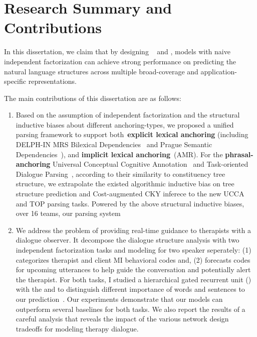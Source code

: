 \section[Research Summary and Contributions]{Research Summary and Contributions}
\label{sec:conclustions:claims}

In this dissertation, we claim that by designing ~ and ,
models with naive independent factorization can achieve strong
performance on predicting the natural language structures across
multiple broad-coverage and application-specific representations.

The main contributions of this dissertation are as follows:

\begin{enumerate}
\item Based on the assumption of independent factorization and the
  structural inductive biases about different anchoring-types, we
  proposed a unified parsing framework to support
  both~\textbf{explicit lexical anchoring} (including DELPH-IN MRS
  Bilexical Dependencies~\citep[DM,][]{Iva:Oep:Ovr:12} and Prague
  Semantic
  Dependencies~\citep[PSD,][]{hajic2012announcing,miyao2014house}),
  and \textbf{implicit lexical anchoring}~(AMR). For the
  \textbf{phrasal-anchoring} Universal Conceptual Cognitive
  Annotation~\citep[UCCA,][]{Abe:Rap:13b} and Task-oriented
  Dialogue Parsing~\citep[TOP,][]{gupta-etal-2018-semantic-parsing},
  according to their similarity to constituency tree structure, we
  extrapolate the existed algorithmic inductive bias on tree structure
  prediction and Cost-augmented CKY inferece to the new UCCA and TOP
  parsing tasks. Powered by the above structural inductive biases,
  over 16 teams, our parsing system~\citep{cao2019amazon} 

\item We address the problem of providing real-time guidance to
  therapists with a dialogue observer. It decompose the dialogue
  structure analysis with two independent factorization tasks and
  modeling for two speaker seperately: (1) categorizes therapist and
  client MI behavioral codes and, (2) forecasts codes for upcoming
  utterances to help guide the conversation and potentially alert the
  therapist. For both tasks, I studied a hierarchical gated recurrent
  unit (\HGRU) with the  and
   to distinguish different importance of
  words and sentences to our
  prediction~\citep{jie2019psycdialacl}. Our experiments demonstrate
  that our models can outperform several baselines for both tasks.  We
  also report the results of a careful analysis that reveals the
  impact of the various network design tradeoffs for modeling therapy
  dialogue.


\end{enumerate}

